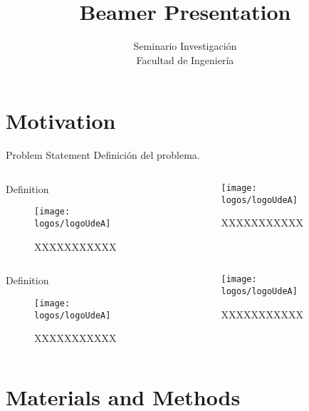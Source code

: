 \documentclass{beamer}
\title{Beamer Presentation}
\author{Seminario Investigación\\Facultad de Ingeniería}
\begin{document}
	
	\frame[plain]{\titlepage}
	
	\section{Motivation}
	
	\begin{frame}{Problem Statement}
Definición del problema.


	
	\begin{columns}
		\begin{column}{0.45\linewidth}
			\begin{block}{Definition}
				\begin{figure}
				\texttt{[image: logos/logoUdeA]}
				\caption{XXXXXXXXXXX}
			\end{figure}
			\end{block}
		\end{column}
	\begin{column}{0.45\linewidth}
		\begin{figure}
			\texttt{[image: logos/logoUdeA]}
			\caption{XXXXXXXXXXX}
		\end{figure}
	\end{column}
	\end{columns}

\begin{columns}
	\begin{column}{0.45\linewidth}
		\begin{block}{Definition}
			\begin{figure}
				\texttt{[image: logos/logoUdeA]}
				\caption{XXXXXXXXXXX}
			\end{figure}
		\end{block}
	\end{column}
	\begin{column}{0.45\linewidth}
		\begin{figure}
			\texttt{[image: logos/logoUdeA]}
			\caption{XXXXXXXXXXX}
		\end{figure}
	\end{column}
\end{columns}

\end{frame}
	
	\section{Materials and Methods}
	
\end{document}
